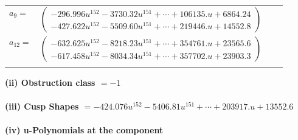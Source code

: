 \documentclass[1p]{elsarticle_modified}
\theoremstyle{definition}
\begin{document}
\begin{tabular}{m{7pt} m{180pt} m{7pt} m{180pt} }
\flushright $a_{9}=$&$\begin{pmatrix}-296.996 u^{152}-3730.32 u^{151}+\cdots+106135. u+6864.24\\-427.622 u^{152}-5509.60 u^{151}+\cdots+219446. u+14552.8\end{pmatrix}$ \\
\flushright $a_{12}=$&$\begin{pmatrix}-632.625 u^{152}-8218.23 u^{151}+\cdots+354761. u+23565.6\\-617.458 u^{152}-8034.34 u^{151}+\cdots+357702. u+23903.3\end{pmatrix}$\\&\end{tabular}
\flushleft \textbf{(ii) Obstruction class $= -1$}\\~\\
\flushleft \textbf{(iii) Cusp Shapes $= -424.076 u^{152}-5406.81 u^{151}+\cdots+203917. u+13552.6$}\\~\\
\newpage\renewcommand{\arraystretch}{1}
\flushleft \textbf{(iv) u-Polynomials at the component}\newline \\
\end{document}
